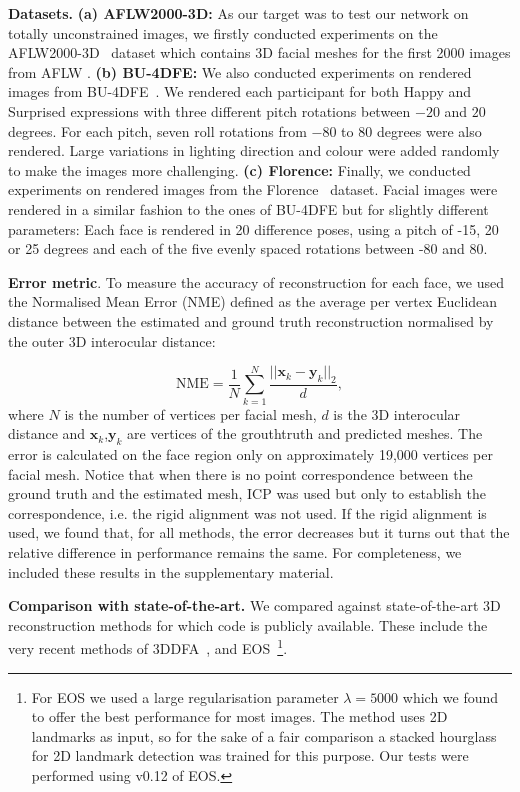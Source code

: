 \textbf{Datasets.} \textbf{(a) AFLW2000-3D:} As our target
was to test our network on totally unconstrained images, we firstly
conducted experiments on the AFLW2000-3D~\cite{zhu2016face} dataset
which contains 3D facial meshes for the first 2000 images from AFLW
\cite{aflw2011}. \textbf{(b) BU-4DFE:} We also conducted
experiments on rendered images from BU-4DFE~\cite{yin2008high}. We
rendered each participant for both Happy and Surprised expressions
with three different pitch rotations between $-20$ and $20$
degrees. For each pitch, seven roll rotations from $-80$ to $80$
degrees were also rendered. Large variations in lighting direction and
colour were added randomly to make the images more challenging.   \textbf{(c) Florence:} Finally,
we conducted experiments on rendered images from the
Florence~\cite{masi2d3dFaceData} dataset. Facial images were rendered
in a similar fashion to the ones of BU-4DFE but for slightly different
parameters: Each face is rendered in 20 difference poses, using a
pitch of -15, 20 or 25 degrees and each of the five evenly spaced
rotations between -80 and 80. 

\textbf{Error metric}. To measure the accuracy of reconstruction for each face, we used the Normalised Mean Error (NME) defined as the average per vertex Euclidean distance between the estimated and ground truth reconstruction normalised by the outer 3D interocular distance:

\begin{equation}
\textrm{NME} = \frac{1}{N} \sum_{k=1}^{N} \frac{||\mathbf{x}_k-\mathbf{y}_{k} ||_{2} }{d}, \label{eq:err}
\end{equation}
where $N$ is the number of vertices per facial mesh, $d$ is the 3D
interocular distance and $\mathbf{x}_k$,$\mathbf{y}_k$ are vertices of the grouthtruth and predicted meshes. The error is calculated on the face region only
on approximately 19,000 vertices per facial mesh. Notice that when
there is no point correspondence between the ground truth and the
estimated mesh, ICP was used but only to establish the
correspondence, i.e. the rigid alignment was not used. If the rigid
alignment is used, we found that, for all methods, the error decreases
but it turns out that the relative difference in performance remains
the same. For completeness, we included these results in the
supplementary material.

\textbf{Comparison with
  state-of-the-art.} We compared against state-of-the-art 3D
reconstruction methods for which code is publicly available. These include the very recent methods of 3DDFA~\cite{zhu2016face},  and EOS~\cite{huber2016multiresolution}\footnote{For EOS we used
  a large regularisation parameter $\lambda = 5000$ which we found to
  offer the best performance for most images. The method uses 2D landmarks as input, so for the
  sake of a fair comparison a stacked hourglass for 2D landmark
  detection was trained for this purpose. Our tests were performed
  using v0.12 of EOS.}. %




